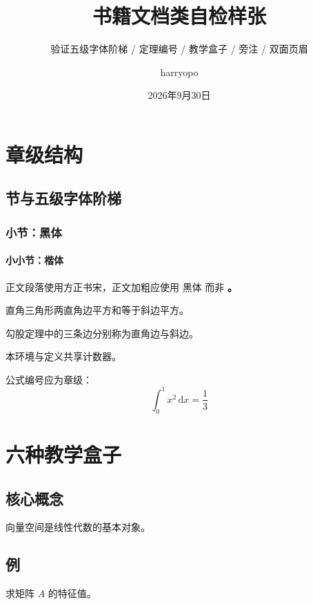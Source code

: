 \documentclass[11pt,a4paper]{harryopo-book}
\title{书籍文档类自检样张}
\subtitle{验证五级字体阶梯 / 定理编号 / 教学盒子 / 旁注 / 双面页眉}
\author{harryopo}
\institute{harryopo-office}
\date{2026年9月30日}
\begin{document}
\frontmatter
\maketitle
\tableofcontents

\mainmatter
\chapter{章级结构}
\section{节与五级字体阶梯}
\subsection{小节：黑体}
\subsubsection{小小节：楷体}
正文段落使用方正书宋，正文加粗应使用 {\fzht 黑体} 而非 \textbf。


\begin{theorem}[勾股定理]
直角三角形两直角边平方和等于斜边平方。
\end{theorem}
\begin{definition}
勾股定理中的三条边分别称为直角边与斜边。
\end{definition}
\begin{remark}
本环境与定义共享计数器。
\end{remark}

公式编号应为章级：
\begin{equation}
  \int_0^1 x^2 \,\mathrm{d}x = \frac{1}{3}
\end{equation}

\chapter{六种教学盒子}
\section{核心概念}
\begin{keyconcept}
向量空间是线性代数的基本对象。
\end{keyconcept}

\section{例}
\begin{examplebox}
求矩阵 $A$ 的特征值。
\end{examplebox}
\end{document}
